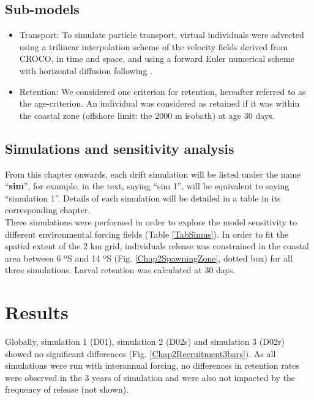\subsection{Sub-models}\label{Chap2MethSubMod}

\begin{itemize}

\item Transport: To simulate particle transport, virtual individuals were advected using a trilinear interpolation scheme of the velocity fields derived from CROCO, in time and space, and using a forward Euler numerical scheme with horizontal diffusion following \cite{PeliMarc2007}.\\

\item Retention: We considered one criterion for retention, hereafter referred to as the age-criterion. An individual was considered as retained if it was within the coastal zone (offshore limit: the 2000 m isobath) at age 30 days.\\

\end{itemize}

\subsection{Simulations and sensitivity analysis}\label{Chap2MethSimSens}

From this chapter onwards, each drift simulation will be listed under the name ``\textbf{sim}'', for example, in the text, saying ``sim 1'', will be equivalent to saying ``simulation 1''. Details of each simulation will be detailed in a table in its corresponding chapter.\\

Three simulations were performed in order to explore the model sensitivity to different environmental forcing fields (Table \ref{TabSimus}). In order to fit the spatial extent of the 2 km grid, individuals release was constrained in the coastal area between 6 ºS and 14 ºS (Fig. \ref{Chap2SpawningZone}, dotted box) for all three simulations. Larval retention was calculated at 30 days.\\

\clearpage

\section{Results}\label{Chap2Resu}

Globally, simulation 1 (D01), simulation 2 (D02s) and simulation 3 (D02r) showed no significant differences (Fig. \ref{Chap2Recruitment3bars}). As all simulations were run with interannual forcing, no differences in retention rates were observed in the 3 years of simulation and were also not impacted by the frequency of release (not shown).\\

